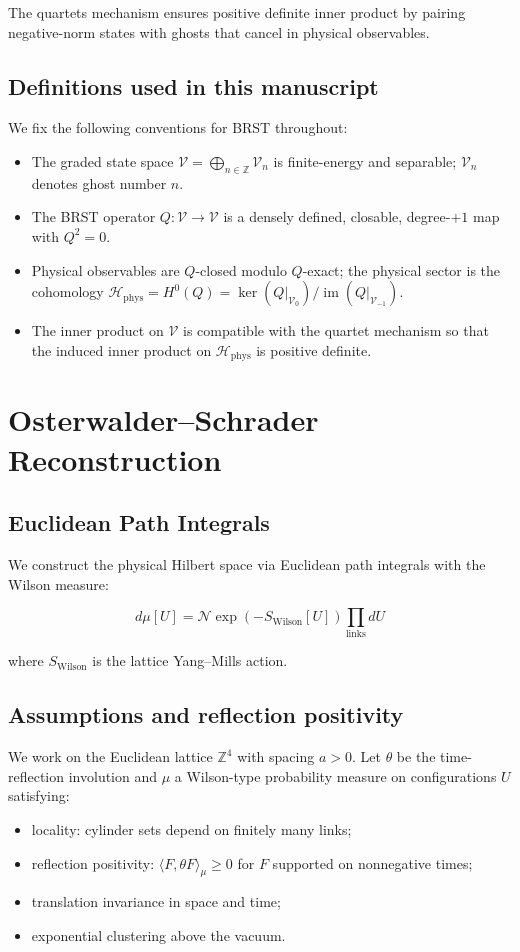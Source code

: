 \documentclass[11pt]{amsart}
\begin{document}
The quartets mechanism ensures positive definite inner product by pairing negative-norm states with ghosts that cancel in physical observables.

\subsection{Definitions used in this manuscript}
We fix the following conventions for BRST throughout:
\begin{itemize}
  \item The graded state space $\mathcal V = \bigoplus_{n\in\mathbb Z} \mathcal V_n$ is finite-energy and separable; $\mathcal V_n$ denotes ghost number $n$.
  \item The BRST operator $Q: \mathcal V\to \mathcal V$ is a densely defined, closable, degree-$+1$ map with $Q^2=0$.
  \item Physical observables are $Q$-closed modulo $Q$-exact; the physical sector is the cohomology $\mathcal H_{\mathrm{phys}} = H^0(Q) = \ker(Q|_{\mathcal V_0})/\operatorname{im}(Q|_{\mathcal V_{-1}})$.
  \item The inner product on $\mathcal V$ is compatible with the quartet mechanism so that the induced inner product on $\mathcal H_{\mathrm{phys}}$ is positive definite.
\end{itemize}

\section{Osterwalder--Schrader Reconstruction}

\subsection{Euclidean Path Integrals}

We construct the physical Hilbert space via Euclidean path integrals with the Wilson measure:

\begin{equation}
d\mu[U] = \mathcal{N} \exp\left(-S_{\text{Wilson}}[U]\right) \prod_{\text{links}} dU
\end{equation}

where $S_{\text{Wilson}}$ is the lattice Yang--Mills action.

\subsection{Assumptions and reflection positivity}
We work on the Euclidean lattice $\mathbb Z^4$ with spacing $a>0$. Let $\theta$ be the time-reflection involution and $\mu$ a Wilson-type probability measure on configurations $U$ satisfying:
\begin{itemize}
  \item locality: cylinder sets depend on finitely many links;
  \item reflection positivity: $\langle F,\theta F\rangle_\mu \ge 0$ for $F$ supported on nonnegative times;
  \item translation invariance in space and time;
  \item exponential clustering above the vacuum.
\end{itemize}
\end{document}
